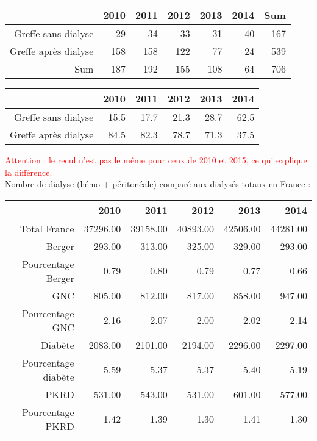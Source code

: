 \documentclass[11pt,a4paper]{article}\usepackage[]{graphicx}\usepackage[]{color}
\begin{document}
\begin{table}[H]
\centering
\begin{tabular}{rrrrrrr}
  \hline
 & 2010 & 2011 & 2012 & 2013 & 2014 & Sum \\ 
  \hline
Greffe sans dialyse & 29 & 34 & 33 & 31 & 40 & 167 \\ 
  Greffe après dialyse & 158 & 158 & 122 & 77 & 24 & 539 \\ 
  Sum & 187 & 192 & 155 & 108 & 64 & 706 \\ 
   \hline
\end{tabular}
\end{table}
\begin{table}[H]
\centering
\begin{tabular}{rrrrrr}
  \hline
 & 2010 & 2011 & 2012 & 2013 & 2014 \\ 
  \hline
Greffe sans dialyse & 15.5 & 17.7 & 21.3 & 28.7 & 62.5 \\ 
  Greffe après dialyse & 84.5 & 82.3 & 78.7 & 71.3 & 37.5 \\ 
   \hline
\end{tabular}
\end{table}


\textcolor{red}{Attention : le recul n'est pas le même pour ceux de 2010 et 2015, ce qui explique la différence.}
~\\

Nombre de dialyse (hémo + péritonéale) comparé aux dialysés totaux en France :

\begin{table}[H]
\centering
\begin{tabular}{rrrrrr}
  \hline
 & 2010 & 2011 & 2012 & 2013 & 2014 \\ 
  \hline
Total France & 37296.00 & 39158.00 & 40893.00 & 42506.00 & 44281.00 \\ 
  Berger & 293.00 & 313.00 & 325.00 & 329.00 & 293.00 \\ 
  Pourcentage Berger & 0.79 & 0.80 & 0.79 & 0.77 & 0.66 \\ 
  GNC & 805.00 & 812.00 & 817.00 & 858.00 & 947.00 \\ 
  Pourcentage GNC & 2.16 & 2.07 & 2.00 & 2.02 & 2.14 \\ 
  Diabète & 2083.00 & 2101.00 & 2194.00 & 2296.00 & 2297.00 \\ 
  Pourcentage diabète & 5.59 & 5.37 & 5.37 & 5.40 & 5.19 \\ 
  PKRD & 531.00 & 543.00 & 531.00 & 601.00 & 577.00 \\ 
  Pourcentage PKRD & 1.42 & 1.39 & 1.30 & 1.41 & 1.30 \\ 
   \hline
\end{tabular}
\end{table}
\end{document}
